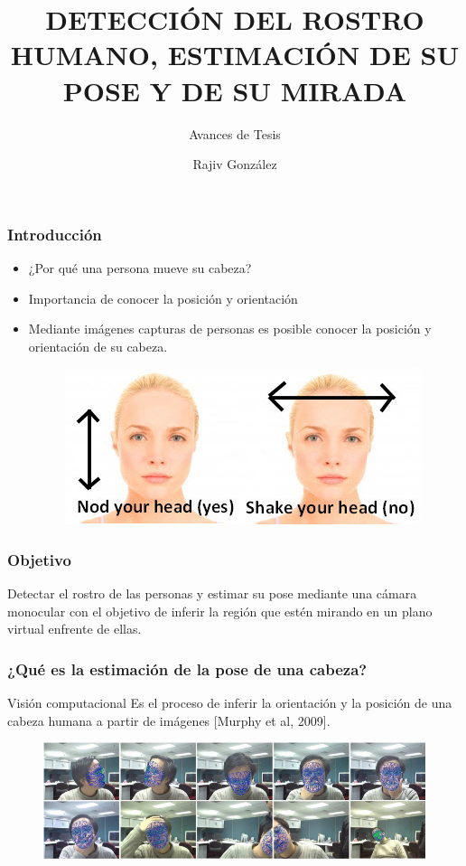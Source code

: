 \documentclass[10pt, compress]{beamer}
\title{\sc DETECCIÓN DEL ROSTRO HUMANO, ESTIMACIÓN DE SU POSE Y DE SU MIRADA}
\subtitle{Avances de Tesis}
\author{Rajiv González}
\institute{Maestría en Ciencias de la Computación, UADY}
\begin{document}
\maketitle

\begin{frame}[fragile]
	\frametitle{Introducción}
	\begin{itemize}
		\item ¿Por qué una persona mueve su cabeza?
		\item Importancia de conocer la posición y orientación
		\item Mediante imágenes capturas de personas es posible conocer la posición y orientación de su cabeza.

		\begin{figure}[htbp]
			\centering
			\includegraphics[width=.5\textwidth]{./pictures/nod}
		\end{figure}
	\end{itemize}

\end{frame}

\begin{frame}[fragile]
\frametitle{Objetivo}
  \begin{block}{}
  Detectar el rostro de las personas y estimar su pose mediante una cámara monocular con el objetivo de inferir la región que estén mirando en un plano virtual enfrente de ellas.
  \end{block}
\end{frame}

\begin{frame}[fragile]
\frametitle{¿Qué es la estimación de la pose de una cabeza?}
  \begin{block}{Visión computacional}
	Es el proceso de inferir la orientación y la posición de una cabeza
	humana a partir de imágenes [Murphy et al, 2009].
  \end{block}
	\begin{figure}[htbp]
		\centering
		\includegraphics[width=.9\textwidth]{./pictures/pose}
	\end{figure}
\end{frame}
\end{document}

